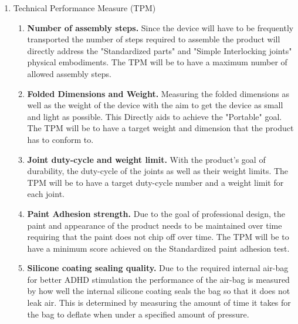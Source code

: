 \begin{enumerate}
\begin{enumerate}
              measuring the manufacturing time and material cost per part of the
              device possible bottlenecks could be eliminated as well as
              individual parts simplified. Also analyzing manufacturing time to
              simplify and streamline the manufacturing process. Directly
              addressing the "Affordable manufacturing" objective.
          \end{enumerate}
        \item Technical Performance Measure (TPM) \\
          \begin{enumerate}
            \item \textbf{Number of assembly steps.} Since the device will have
              to be frequently transported the number of steps required to
              assemble the product will directly address the "Standardized parts"
              and "Simple Interlocking joints" physical embodiments. The TPM
              will be to have a maximum number of allowed assembly steps.
            \item \textbf{Folded Dimensions and Weight.} Measuring the folded
              dimensions as well as the weight of the device with the aim to get
              the device as small and light as possible. This Directly aids to
              achieve the "Portable" goal. The TPM will be to have a target
              weight and dimension that the product has to conform to.
            \item \textbf{Joint duty-cycle and weight limit.} With the product's goal of 
              durability, the duty-cycle of the joints as well as their weight
              limits. The TPM will be to have a target duty-cycle number and a
              weight limit for each joint.
            \item \textbf{Paint Adhesion strength.} Due to the goal of
              professional design, the paint and appearance of the product
              needs to be maintained over time requiring that the paint does not chip
              off over time. The TPM will be to have a minimum score achieved on
              the Standardized paint adhesion test.
            \item \textbf{Silicone coating sealing quality.} Due to the required
              internal air-bag for better ADHD stimulation the performance of the
              air-bag is measured by how well the internal silicone coating seals
              the bag so that it does not leak air. This is determined by
              measuring the amount of time it takes for the bag to deflate when
              under a specified amount of pressure.
          \end{enumerate}
      \end{enumerate}
